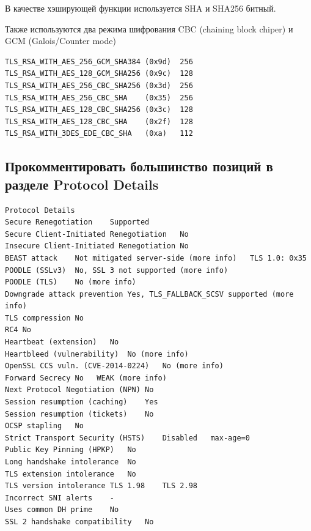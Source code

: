 \documentclass[10pt,a4paper]{article}
\begin{document}
В качестве хэширующей функции используется SHA и SHA256 битный.

Также используются два режима шифрования CBC  (chaining block chiper) и GCM (Galois/Counter mode)
\small
\begin{lstlisting}
TLS_RSA_WITH_AES_256_GCM_SHA384 (0x9d)	256
TLS_RSA_WITH_AES_128_GCM_SHA256 (0x9c)	128
TLS_RSA_WITH_AES_256_CBC_SHA256 (0x3d)	256
TLS_RSA_WITH_AES_256_CBC_SHA 	(0x35)	256
TLS_RSA_WITH_AES_128_CBC_SHA256 (0x3c)	128
TLS_RSA_WITH_AES_128_CBC_SHA 	(0x2f)	128
TLS_RSA_WITH_3DES_EDE_CBC_SHA 	(0xa)	112
\end{lstlisting}

\subsection{Прокомментировать большинство позиций в разделе Protocol Details}
\begin{verbatim}
Protocol Details
Secure Renegotiation	Supported
Secure Client-Initiated Renegotiation	No
Insecure Client-Initiated Renegotiation	No
BEAST attack	Not mitigated server-side (more info)   TLS 1.0: 0x35
POODLE (SSLv3)	No, SSL 3 not supported (more info)
POODLE (TLS)	No (more info)
Downgrade attack prevention	Yes, TLS_FALLBACK_SCSV supported (more info)
TLS compression	No
RC4	No
Heartbeat (extension)	No
Heartbleed (vulnerability)	No (more info)
OpenSSL CCS vuln. (CVE-2014-0224)	No (more info)
Forward Secrecy	No   WEAK (more info)
Next Protocol Negotiation (NPN)	No
Session resumption (caching)	Yes
Session resumption (tickets)	No
OCSP stapling	No
Strict Transport Security (HSTS)	Disabled   max-age=0
Public Key Pinning (HPKP)	No
Long handshake intolerance	No
TLS extension intolerance	No
TLS version intolerance	TLS 1.98 	TLS 2.98 
Incorrect SNI alerts	-
Uses common DH prime	No
SSL 2 handshake compatibility	No
\end{verbatim}
\end{document}

